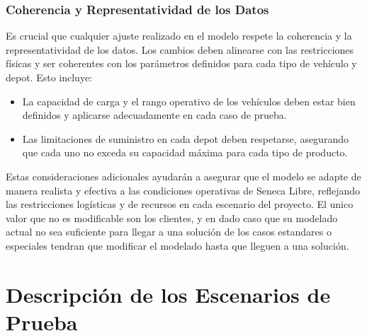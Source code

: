 \documentclass[12pt]{article}
\begin{document}
\subsubsection{Coherencia y Representatividad de los Datos}

Es crucial que cualquier ajuste realizado en el modelo respete la coherencia y la representatividad de los datos. Los cambios deben alinearse con las restricciones físicas y ser coherentes con los parámetros definidos para cada tipo de vehículo y depot. Esto incluye:
\begin{itemize}
    \item La capacidad de carga y el rango operativo de los vehículos deben estar bien definidos y aplicarse adecuadamente en cada caso de prueba.
    \item Las limitaciones de suministro en cada depot deben respetarse, asegurando que cada uno no exceda su capacidad máxima para cada tipo de producto.
\end{itemize}

Estas consideraciones adicionales ayudarán a asegurar que el modelo se adapte de manera realista y efectiva a las condiciones operativas de Seneca Libre, reflejando las restricciones logísticas y de recursos en cada escenario del proyecto. El unico valor que no es modificable son los clientes, y en dado caso que su modelado actual no sea suficiente para llegar a una solución de los casos estandares o especiales tendran que modificar el modelado hasta que lleguen a una solución.

\newpage

\section{Descripción de los Escenarios de Prueba}
\end{document}

